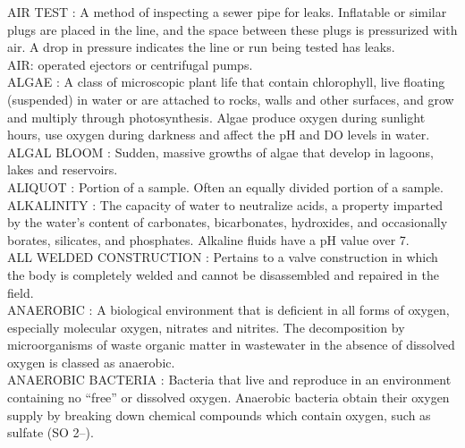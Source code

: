 \vspace{0.15cm}
AIR TEST :  A method of inspecting a sewer pipe for leaks. Inflatable or similar plugs are placed in the line, and the space between these plugs is pressurized with air. A drop in pressure indicates the line or run being tested has leaks. \\
\vspace{0.15cm}
AIR: operated ejectors or centrifugal pumps. \\
\vspace{0.15cm}
ALGAE :  A class of microscopic plant life that contain chlorophyll, live floating (suspended) in water or are attached to rocks, walls and other surfaces, and grow and multiply through photosynthesis. Algae produce oxygen during sunlight hours, use oxygen during darkness and affect the pH and DO levels in water.\\
\vspace{0.15cm}
ALGAL BLOOM :  Sudden, massive growths of algae that develop in lagoons, lakes and reservoirs.\\
\vspace{0.15cm}
ALIQUOT :  Portion of a sample. Often an equally divided portion of a sample.\\
\vspace{0.15cm}
ALKALINITY :   The capacity of water to neutralize acids, a property imparted by the water’s content of carbonates, bicarbonates, hydroxides, and occasionally borates, silicates, and phosphates. Alkaline fluids have a pH value over 7.\\
\vspace{0.15cm}
ALL WELDED CONSTRUCTION :   Pertains to a valve construction in which the body is completely welded and cannot be disassembled and repaired in the field.\\
\vspace{0.15cm}
ANAEROBIC :   A biological environment that is deficient in all forms of oxygen, especially molecular oxygen, nitrates and nitrites. The decomposition by microorganisms of waste organic matter in wastewater in the absence of dissolved oxygen is classed as anaerobic.\\
\vspace{0.15cm}
ANAEROBIC BACTERIA :  Bacteria that live and reproduce in an environment containing no “free” or dissolved oxygen. Anaerobic bacteria obtain their oxygen supply by breaking down chemical compounds which contain oxygen, such as sulfate (SO 2–).\\
\vspace{0.15cm}
